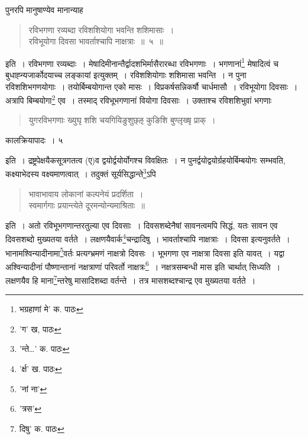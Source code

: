 \documentclass[11pt, openany]{book}
\begin{document}
पुनरपि मानुषाण्येव मानान्याह\textendash

\begin{quote} 
{\ab रविभगणा रव्यब्दा रविशशियोगा भवन्ति शशिमासाः~।\\
रविभूयोगा दिवसा भावर्ताश्चापि नाक्षत्राः~॥~५~॥}
\end{quote} 


\noindent इति~। रविभगणा रव्यब्दाः~। मेषादिमीनान्तैर्द्वादशभिर्मासैरारब्धा रविभगणाः~। भगणानां\renewcommand{\thefootnote}{५}\footnote{भग्रहाणां मे' क. पाठः} मेषादित्वं च {\qt बुधाह्न्यजार्कोदयाच्च लङ्कायां} इत्युक्तम्~। रविशशियोगाः शशिमासा भवन्ति~। न पुना रविशशिभगणयोगाः~। तयोर्बिम्बयोगान्त एको मासः~। विप्रकर्षसन्निकर्षौ चार्धमासौ~। रविभूयोगा दिवसाः~। अत्रापि बिम्बयोगा\renewcommand{\thefootnote}{६}\footnote{'ग' ख, पाठः} एव~। तस्माद् रविभूभगणानां वियोगा दिवसाः~। उक्ताश्च रविशशिभुवां भगणाः\textendash

\begin{quote} 
{\qt युगरविभगणाः ख्युघृ शशि चयगियिङुशुछ्ऌ कुङिशि बुण्लृख्षृ प्राक्~।}
\end{quote}

\newpage

\vspace{3cm} \hspace{4cm}कालक्रियापादः~। \hspace{4cm}५

\vspace{0.3cm}
\noindent इति~। द्रष्ट्रपेक्षयैकसूत्रगतत्व (ए)व द्वयोर्द्वयोर्योगश्च विवक्षितः~।
न पुनर्द्वयोद्वयोर्ग्रहयोर्बिम्बयोगः सम्भवति, कक्ष्याभेदस्य वक्ष्यमाणत्वात्~।
तदुक्तं सूर्यसिद्धान्ते\renewcommand{\thefootnote}{१}\footnote{'न्ते\dots ' क. पाठः}ऽपि\textendash 

\begin{quote}
{\qt भावाभावाय लोकानां कल्पनेयं प्रदर्शिता~।\\
स्वमार्गगाः प्रयान्त्येते दूरमन्योन्यमाश्रिताः~॥}
\end{quote}

\noindent इति~। अतो रविभूभगणान्तरतुल्या एव दिवसाः~। दिवसशब्देनैषां सावनत्वमपि सिद्धं, यतः सावन एव दिवसशब्दो मुख्यतया वर्तते~। लक्षणयैवार्क\renewcommand{\thefootnote}{२}\footnote{'र्क्ष' ख. पाठः}चन्द्रादिषु~। भावर्ताश्चापि नाक्षत्राः~। दिवसा इत्यनुवर्तते~। भानामश्विन्यादीनामा\renewcommand{\thefootnote}{३}\footnote{'नां ना'}वर्तः प्रत्यग्भ्रमणं नाक्षत्रो दिवसः~। भूभगणा एव नाक्षत्रा दिवसा इति यावत्~। यद्वा अश्विन्यादीनां पौष्णान्तानां नक्षत्राणां परिवर्तो नाक्षत्रः\renewcommand{\thefootnote}{४}\footnote{'त्रस'}~। नक्षत्रसम्बन्धी मास इति चार्थात् सिध्यति~।
लक्षणयैव हि माना\renewcommand{\thefootnote}{५}\footnote{दिषु' क. पाठः}न्तरेषु मासादिशब्दा वर्तन्ते~। तत्र मासशब्दश्चान्द्र एव मुख्यतया वर्तते~। 
\end{document}
